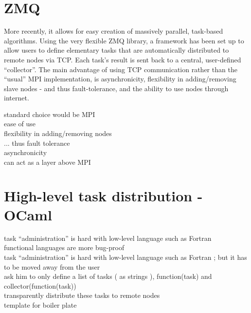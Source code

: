 \documentclass[./thesis.tex]{subfiles}
\begin{document}
\section{ZMQ}
More recently, it allows for easy creation of massively parallel, task-based algorithms.
Using the very flexible ZMQ library, a framework has been set up to allow users to define elementary tasks that are automatically distributed to remote nodes via TCP. Each task's result is sent back to a central, user-defined ``collector''. The main advantage of using TCP communication rather than the ``usual'' MPI implementation, is asynchronicity, flexibility in adding/removing slave nodes - and thus fault-tolerance, and the ability to use nodes through internet.


standard choice would be MPI \\
ease of use \\
flexibility in adding/removing nodes \\
... thus fault tolerance \\
asynchronicity \\
can act as a layer above MPI \\
\section{High-level task distribution - OCaml}
task ``administration'' is hard with low-level language such as Fortran \\
functional languages are more bug-proof \\

task ``administration'' is hard with low-level language such as Fortran ; but it has to be moved away from the user \\
ask him to only define a list of tasks ( as strings ), function(task) and collector(function(task)) \\
transparently distribute these tasks to remote nodes \\
template for boiler plate \\
\end{document}
